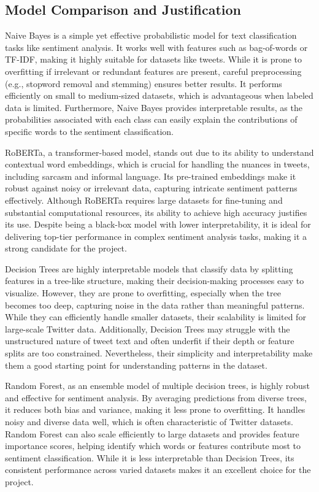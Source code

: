 \documentclass[journal]{IEEEtran}
\begin{document}
\subsection{\textbf{Model Comparison and Justification}}


Naive Bayes is a simple yet effective probabilistic model for text classification tasks like sentiment analysis. It works well with features such as bag-of-words or TF-IDF, making it highly suitable for datasets like tweets. While it is prone to overfitting if irrelevant or redundant features are present, careful preprocessing (e.g., stopword removal and stemming) ensures better results. It performs efficiently on small to medium-sized datasets, which is advantageous when labeled data is limited. Furthermore, Naive Bayes provides interpretable results, as the probabilities associated with each class can easily explain the contributions of specific words to the sentiment classification.

RoBERTa, a transformer-based model, stands out due to its ability to understand contextual word embeddings, which is crucial for handling the nuances in tweets, including sarcasm and informal language. Its pre-trained embeddings make it robust against noisy or irrelevant data, capturing intricate sentiment patterns effectively. Although RoBERTa requires large datasets for fine-tuning and substantial computational resources, its ability to achieve high accuracy justifies its use. Despite being a black-box model with lower interpretability, it is ideal for delivering top-tier performance in complex sentiment analysis tasks, making it a strong candidate for the project.

Decision Trees are highly interpretable models that classify data by splitting features in a tree-like structure, making their decision-making processes easy to visualize. However, they are prone to overfitting, especially when the tree becomes too deep, capturing noise in the data rather than meaningful patterns. While they can efficiently handle smaller datasets, their scalability is limited for large-scale Twitter data. Additionally, Decision Trees may struggle with the unstructured nature of tweet text and often underfit if their depth or feature splits are too constrained. Nevertheless, their simplicity and interpretability make them a good starting point for understanding patterns in the dataset.

Random Forest, as an ensemble model of multiple decision trees, is highly robust and effective for sentiment analysis. By averaging predictions from diverse trees, it reduces both bias and variance, making it less prone to overfitting. It handles noisy and diverse data well, which is often characteristic of Twitter datasets. Random Forest can also scale efficiently to large datasets and provides feature importance scores, helping identify which words or features contribute most to sentiment classification. While it is less interpretable than Decision Trees, its consistent performance across varied datasets makes it an excellent choice for the project.
\end{document}

